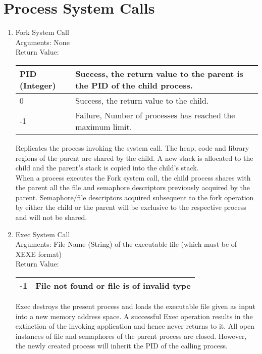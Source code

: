 \section{Process System Calls}
\begin{enumerate}
\item{Fork System Call}\\
Arguments: None\\
Return Value:
\FloatBarrier \begin{table}[H]
\centering
\begin{tabular}{|l|l|}
\hline
PID (Integer)  	& Success, the return value to the parent is the PID of the child process. \\ \hline
0  		& Success, the return value to the child. \\ \hline 
-1 		& Failure, Number of processes has reached the maximum limit.\\ \hline
\end{tabular}
\end{table} \FloatBarrier 

Replicates the process invoking the system call. The heap, code and library regions of the parent are shared by the child. A new stack is allocated to the child and the parent's stack is copied into the child's stack.
\\
When a process executes the Fork system call, the child process shares with the parent all the file and semaphore descriptors previously acquired by the parent. Semaphore/file descriptors acquired subsequent to the fork operation by either the child or the parent will be exclusive to the respective process and will not be shared.
 

\item{Exec System Call}\\
Arguments: File Name (String) of the executable file (which must be of XEXE format)\\
Return Value:
\FloatBarrier \begin{table}[H]
\centering
\begin{tabular}{|l|l|}
\hline
-1 		& File not found or file is of invalid type \\ \hline
\end{tabular}
\end{table} \FloatBarrier 

Exec destroys the present process and loads the executable file given as input into a new memory address space. A successful Exec operation results in the extinction of the invoking application and hence never returns to it. All open instances of file and semaphores of the parent process are closed. However, the newly created process will inherit the PID of the calling process.



\end{enumerate}
